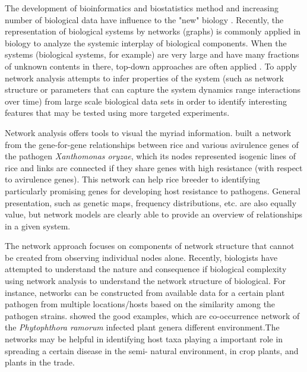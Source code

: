The development of bioinformatics and biostatistics method and increasing number of biological data have influence to the "new" biology . Recently, the representation of biological systems by networks (graphs) is commonly applied in biology to analyze the systemic interplay of biological components. When the systems (biological systems, for example) are very large and have many fractions of unknown contents in there, top-down approaches are often applied . To apply network analysis attempts to infer properties of the system (such as network structure or parameters that can capture the system dynamics range interactions over time) from large scale biological data sets in order to identify interesting features that may be tested using more targeted experiments. 

Network analysis offers tools to visual the myriad information.  built a network from the gene-for-gene relationships between rice and various avirulence genes of the pathogen \textit{Xanthomonas oryzae}, which its nodes represented isogenic lines of rice and links are connected if they share genes with high resistance (with respect to avirulence genes). This network can help rice breeder to identifying particularly promising genes for developing host resistance to pathogens. General presentation, such as genetic maps, frequency distributions, etc. are also equally value, but network models are clearly able to provide an overview of relationships in a given system. 

The network approach focuses on components of network structure that cannot be created from observing individual nodes alone. Recently, biologists have attempted to understand the nature and consequence if biological complexity using network analysis to understand the network structure of biological. For instance, networks can be constructed from available data for a certain plant pathogen from multiple locations/hosts based on the similarity among the pathogen strains.  showed the good examples, which are co-occurrence network of the \textit{Phytophthora ramorum} infected plant genera different environment.The networks may be helpful in identifying host taxa playing a important role in spreading a certain disease in the semi- natural environment, in crop plants, and plants in the trade.

